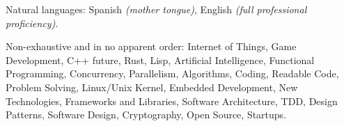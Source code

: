 \documentclass[10pt,a4paper]{article}
\begin{document}
\vspace{0.5em}
\inlineheadsection
  {Natural languages:}
  {Spanish \emph{(mother tongue)}, English \emph{(full professional proficiency)}.}

\spacedhrule{1.6em}{-0.4em}


\inlineheadsection
  {Non-exhaustive and in no apparent order:}
  {Internet of Things, Game Development, C++ future, Rust, Lisp, Artificial Intelligence, Functional Programming, Concurrency, Parallelism, Algorithms, Coding, Readable Code, Problem Solving, Linux/Unix Kernel, Embedded Development, New Technologies, Frameworks and Libraries, Software Architecture, TDD, Design Patterns, Software Design, Cryptography, Open Source, Startups.}
\end{document}
